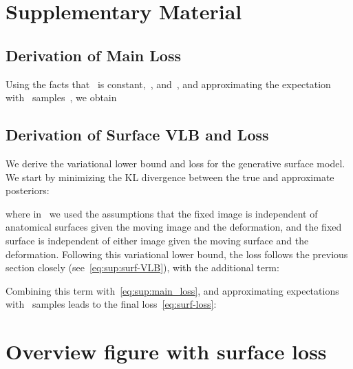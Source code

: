 \documentclass{article}
\begin{document}





\clearpage
\onecolumn
\section*{Supplementary Material}

\subsection*{Derivation of Main Loss}
\label{sec:sup:loss-derivation}


Using the facts that~ is constant,~, and~, and approximating the expectation with~ samples~, we obtain



\subsection*{Derivation of Surface VLB and Loss}
\label{sec:sup:surf-derivation}

We derive the variational lower bound and loss for the generative surface model. We start by minimizing the KL divergence between the true and approximate posteriors:

where in~ we used the assumptions that the fixed image is independent of anatomical surfaces given the moving image and the deformation, and the fixed surface is independent of either image given the moving surface and the deformation. Following this variational lower bound, the loss follows the previous section closely (see~\eqref{eq:sup:surf-VLB}), with the additional term:

Combining this term with~\eqref{eq:sup:main_loss}, and approximating expectations with~ samples leads to the final loss~\eqref{eq:surf-loss}:



\clearpage
\section*{Overview figure with surface loss}
\end{document}
